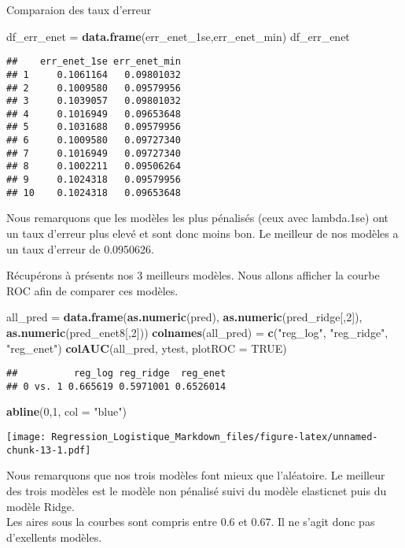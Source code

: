 \documentclass[
]{article}
\newenvironment{Shaded}{\begin{snugshade}}{\end{snugshade}}
\newcommand{\DataTypeTok}[1]{\textcolor[rgb]{0.13,0.29,0.53}{#1}}
\newcommand{\DecValTok}[1]{\textcolor[rgb]{0.00,0.00,0.81}{#1}}
\newcommand{\KeywordTok}[1]{\textcolor[rgb]{0.13,0.29,0.53}{\textbf{#1}}}
\newcommand{\NormalTok}[1]{#1}
\newcommand{\OtherTok}[1]{\textcolor[rgb]{0.56,0.35,0.01}{#1}}
\newcommand{\StringTok}[1]{\textcolor[rgb]{0.31,0.60,0.02}{#1}}
\begin{document}
Comparaion des taux d'erreur

\begin{Shaded}
\begin{Highlighting}[]
\NormalTok{df_err_enet =}\StringTok{ }\KeywordTok{data.frame}\NormalTok{(err_enet_1se,err_enet_min)}
\NormalTok{df_err_enet}
\end{Highlighting}
\end{Shaded}

\begin{verbatim}
##    err_enet_1se err_enet_min
## 1     0.1061164   0.09801032
## 2     0.1009580   0.09579956
## 3     0.1039057   0.09801032
## 4     0.1016949   0.09653648
## 5     0.1031688   0.09579956
## 6     0.1009580   0.09727340
## 7     0.1016949   0.09727340
## 8     0.1002211   0.09506264
## 9     0.1024318   0.09579956
## 10    0.1024318   0.09653648
\end{verbatim}

Nous remarquons que les modèles les plus pénalisés (ceux avec
lambda.1se) ont un taux d'erreur plus elevé et sont donc moins bon. Le
meilleur de nos modèles a un taux d'erreur de 0.0950626.

Récupérons à présents nos 3 meilleurs modèles. Nous allons afficher la
courbe ROC afin de comparer ces modèles.

\begin{Shaded}
\begin{Highlighting}[]
\NormalTok{all_pred =}\StringTok{ }\KeywordTok{data.frame}\NormalTok{(}\KeywordTok{as.numeric}\NormalTok{(pred), }\KeywordTok{as.numeric}\NormalTok{(pred_ridge[,}\DecValTok{2}\NormalTok{]), }\KeywordTok{as.numeric}\NormalTok{(pred_enet8[,}\DecValTok{2}\NormalTok{]))}
\KeywordTok{colnames}\NormalTok{(all_pred) =}\StringTok{ }\KeywordTok{c}\NormalTok{(}\StringTok{"reg_log"}\NormalTok{, }\StringTok{"reg_ridge"}\NormalTok{, }\StringTok{"reg_enet"}\NormalTok{)}
\KeywordTok{colAUC}\NormalTok{(all_pred, ytest, }\DataTypeTok{plotROC =} \OtherTok{TRUE}\NormalTok{)}
\end{Highlighting}
\end{Shaded}

\begin{verbatim}
##          reg_log reg_ridge  reg_enet
## 0 vs. 1 0.665619 0.5971001 0.6526014
\end{verbatim}

\begin{Shaded}
\begin{Highlighting}[]
\KeywordTok{abline}\NormalTok{(}\DecValTok{0}\NormalTok{,}\DecValTok{1}\NormalTok{, }\DataTypeTok{col =} \StringTok{"blue"}\NormalTok{)}
\end{Highlighting}
\end{Shaded}

\texttt{[image: Regression\_Logistique\_Markdown\_files/figure-latex/unnamed-chunk-13-1.pdf]}

Nous remarquons que nos trois modèles font mieux que l'aléatoire. Le
meilleur des trois modèles est le modèle non pénalisé suivi du modèle
elasticnet puis du modèle Ridge.\\
Les aires sous la courbes sont compris entre 0.6 et 0.67. Il ne s'agit
donc pas d'exellents modèles.
\end{document}
